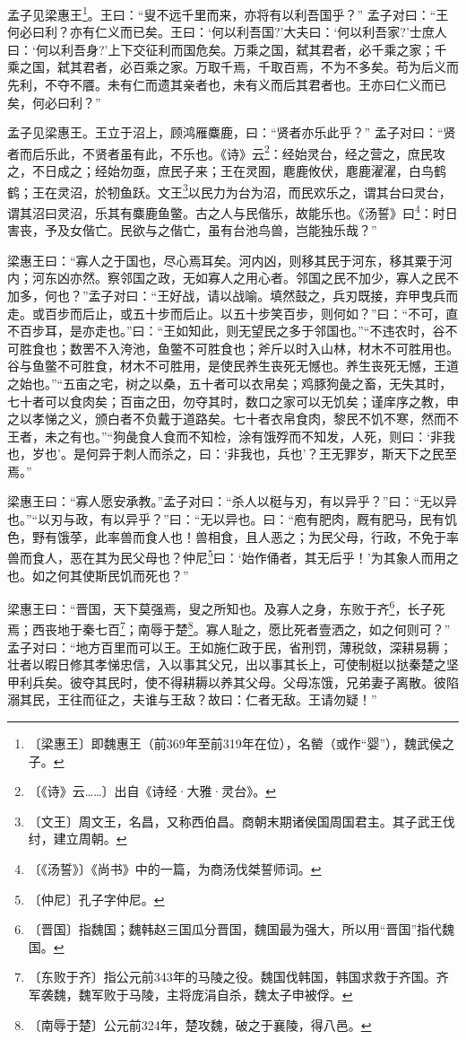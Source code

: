 \documentclass[12pt,UTF-8,openany]{ctexbook}
\begin{document}
\begin{normalsize}
    
    孟子见梁惠王\footnote{〔梁惠王〕即魏惠王（前369年至前319年在位），名罃（或作“婴”），魏武侯之子。}。王曰：“叟不远千里而来，亦将有以利吾国乎？” 孟子对曰：“王何必曰利？亦有仁义而已矣。王曰：‘何以利吾国?’大夫曰：‘何以利吾家?’士庶人曰：‘何以利吾身?’上下交征利而国危矣。万乘之国，弑其君者，必千乘之家；千乘之国，弑其君者，必百乘之家。万取千焉，千取百焉，不为不多矣。苟为后义而先利，不夺不餍。未有仁而遗其亲者也，未有义而后其君者也。王亦曰仁义而已矣，何必曰利？”
    
    孟子见梁惠王。王立于沼上，顾鸿雁麋鹿，曰：“贤者亦乐此乎？” 孟子对曰：“贤者而后乐此，不贤者虽有此，不乐也。《诗》云\footnote{〔《诗》云……〕出自《诗经·大雅·灵台》。}：经始灵台，经之营之，庶民攻之，不日成之；经始勿亟，庶民子来；王在灵囿，麀鹿攸伏，麀鹿濯濯，白鸟鹤鹤；王在灵沼，於牣鱼跃。文王\footnote{〔文王〕周文王，名昌，又称西伯昌。商朝末期诸侯国周国君主。其子武王伐纣，建立周朝。}以民力为台为沼，而民欢乐之，谓其台曰灵台，谓其沼曰灵沼，乐其有麋鹿鱼鳖。古之人与民偕乐，故能乐也。《汤誓》曰\footnote{〔《汤誓》〕《尚书》中的一篇，为商汤伐桀誓师词。}：时日害丧，予及女偕亡。民欲与之偕亡，虽有台池鸟兽，岂能独乐哉？”
    
    梁惠王曰：“寡人之于国也，尽心焉耳矣。河内凶，则移其民于河东，移其粟于河内；河东凶亦然。察邻国之政，无如寡人之用心者。邻国之民不加少，寡人之民不加多，何也？”孟子对曰：“王好战，请以战喻。填然鼓之，兵刃既接，弃甲曳兵而走。或百步而后止，或五十步而后止。以五十步笑百步，则何如？”曰：“不可，直不百步耳，是亦走也。”曰：“王如知此，则无望民之多于邻国也。”“不违农时，谷不可胜食也；数罟不入洿池，鱼鳖不可胜食也；斧斤以时入山林，材木不可胜用也。谷与鱼鳖不可胜食，材木不可胜用，是使民养生丧死无憾也。养生丧死无憾，王道之始也。”“五亩之宅，树之以桑，五十者可以衣帛矣；鸡豚狗彘之畜，无失其时，七十者可以食肉矣；百亩之田，勿夺其时，数口之家可以无饥矣；谨庠序之教，申之以孝悌之义，颁白者不负戴于道路矣。七十者衣帛食肉，黎民不饥不寒，然而不王者，未之有也。”“狗彘食人食而不知检，涂有饿殍而不知发，人死，则曰：‘非我也，岁也’。是何异于刺人而杀之，曰：‘非我也，兵也’？王无罪岁，斯天下之民至焉。”
    
    梁惠王曰：“寡人愿安承教。”孟子对曰：“杀人以梃与刃，有以异乎？”曰：“无以异也。”“以刃与政，有以异乎？”曰：“无以异也。曰：“庖有肥肉，厩有肥马，民有饥色，野有饿莩，此率兽而食人也！兽相食，且人恶之；为民父母，行政，不免于率兽而食人，恶在其为民父母也？仲尼\footnote{〔仲尼〕孔子字仲尼。}曰：‘始作俑者，其无后乎！’为其象人而用之也。如之何其使斯民饥而死也？”
    
    梁惠王曰：“晋国，天下莫强焉，叟之所知也。及寡人之身，东败于齐\footnote{〔晋国〕指魏国；魏韩赵三国瓜分晋国，魏国最为强大，所以用“晋国”指代魏国。}，长子死焉；西丧地于秦七百\footnote{〔东败于齐〕指公元前343年的马陵之役。魏国伐韩国，韩国求救于齐国。齐军袭魏，魏军败于马陵，主将庞涓自杀，魏太子申被俘。}；南辱于楚\footnote{〔南辱于楚〕公元前324年，楚攻魏，破之于襄陵，得八邑。}。寡人耻之，愿比死者壹洒之，如之何则可？” 孟子对曰：“地方百里而可以王。王如施仁政于民，省刑罚，薄税敛，深耕易耨；壮者以暇日修其孝悌忠信，入以事其父兄，出以事其长上，可使制梃以挞秦楚之坚甲利兵矣。彼夺其民时，使不得耕耨以养其父母。父母冻饿，兄弟妻子离散。彼陷溺其民，王往而征之，夫谁与王敌？故曰：仁者无敌。王请勿疑！”
    

\end{normalsize}
\end{document}
